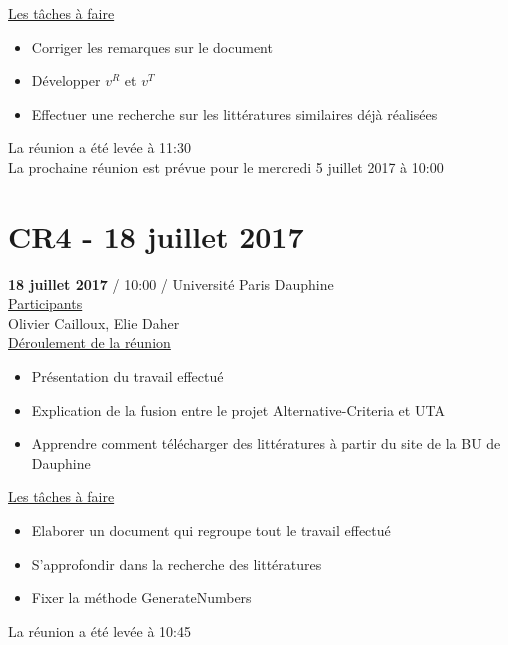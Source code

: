 \documentclass{report}
\begin{document}
\begin{appendices}
\underline{Les tâches à faire} \\
\begin{itemize}
	\item Corriger les remarques sur le document
	\item Développer $v^R$ et $v^T$
	\item Effectuer une recherche sur les littératures similaires déjà réalisées\\
\end{itemize}

La réunion a été levée à 11:30\\

La prochaine réunion est prévue pour le mercredi 5 juillet 2017 à 10:00

\newpage
\section{CR4 - 18 juillet 2017}
\textbf{18 juillet 2017} / 10:00 / Université Paris Dauphine \\

\underline{Participants} \\

Olivier Cailloux, Elie Daher\\

\underline{Déroulement de la réunion}\\
\begin{itemize}
	\item Présentation du travail effectué
	\item Explication de la fusion entre le projet Alternative-Criteria et UTA
	\item Apprendre comment télécharger des littératures à partir du site de la BU de Dauphine\\
\end{itemize}

\underline{Les tâches à faire} \\
\begin{itemize}
	\item Elaborer un document qui regroupe tout le travail effectué
	\item S’approfondir dans la recherche des littératures
	\item Fixer la méthode GenerateNumbers\\
\end{itemize}

La réunion a été levée à 10:45\\


\end{appendices}
\end{document}
